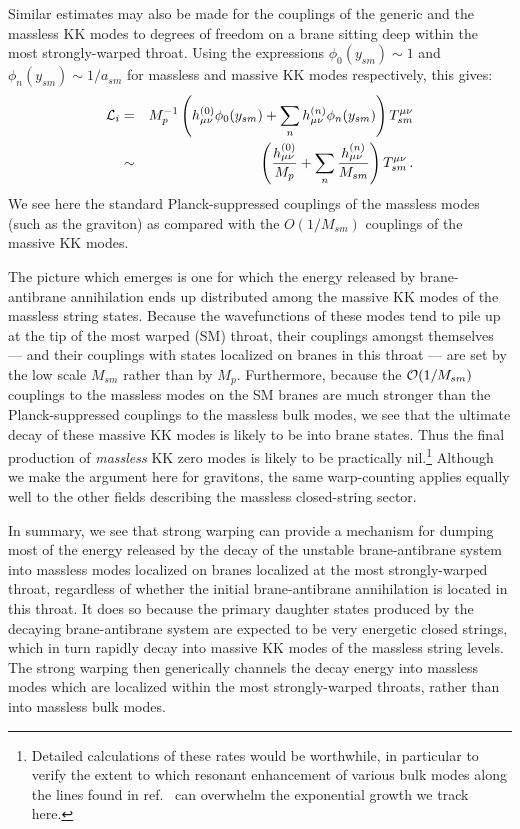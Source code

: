 \documentclass[12pt]{JHEP3}
\def\beqa{\begin{eqnarray}}
\def\eeqa{\end{eqnarray}}
\begin{document}
Similar estimates may also be made for the couplings of the
generic and the massless KK modes to degrees of freedom on a brane
sitting deep within the most strongly-warped throat. Using the
expressions $\phi_0(y_{sm}) \sim 1$ and $\phi_n(y_{sm}) \sim
1/a_{sm}$ for massless and massive KK modes respectively, this
gives:
%
\beqa
    {\cal L}_i &=& M_p^{-1}\left({h_{\mu\nu}^{(0)}\phi_0(y_{sm})} +
    \sum_n{h_{\mu\nu}^{(n)}\phi_n(y_{sm})}\right)
    T^{\mu\nu}_{sm} \nonumber\\
     &\sim& \left({h_{\mu\nu}^{(0)}\over M_p} +
    \sum_n{h_{\mu\nu}^{(n)}\over M_{sm}}\right) T^{\mu\nu}_{sm}
    \,.
\eeqa
%
We see here the standard Planck-suppressed couplings of the
massless modes (such as the graviton) as compared with the
$O(1/M_{sm})$ couplings of the massive KK modes.

The picture which emerges is one for which the energy released by
brane-antibrane annihilation ends up distributed among the massive
KK modes of the massless string states. Because the wavefunctions
of these modes tend to pile up at the tip of the most warped (SM)
throat, their couplings amongst themselves --- and their couplings
with states localized on branes in this throat --- are set by the
low scale $M_{sm}$ rather than by $M_p$. Furthermore, because the
${\cal O}(1/M_{sm})$ couplings to the massless modes on the SM
branes are much stronger than the Planck-suppressed couplings to
the massless bulk modes, we see that the ultimate decay of these
massive KK modes is likely to be into brane states. Thus the final
production of {\it massless} KK zero modes is likely to be
practically nil.\footnote{Detailed calculations of these rates
would be worthwhile, in particular to verify the extent to which
resonant enhancement of various bulk modes along the lines found
in ref.~\cite{RobnJoe} can overwhelm the exponential growth we
track here.} Although we make the argument here for gravitons, the
same warp-counting applies equally well to the other fields
describing the massless closed-string sector.

In summary, we see that strong warping can provide a mechanism for
dumping most of the energy released by the decay of the unstable
brane-antibrane system into massless modes localized on branes
localized at the most strongly-warped throat, regardless of
whether the initial brane-antibrane annihilation is located in
this throat. It does so because the primary daughter states
produced by the decaying brane-antibrane system are expected to be
very energetic closed strings, which in turn rapidly decay into
massive KK modes of the massless string levels. The strong warping
then generically channels the decay energy into massless modes
which are localized within the most strongly-warped throats,
rather than into massless bulk modes.
\end{document}
